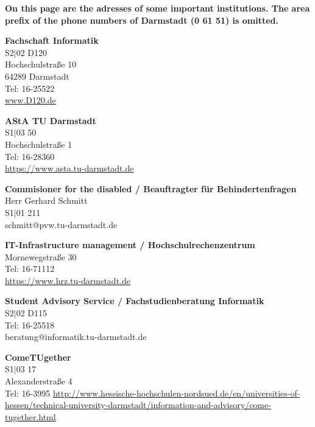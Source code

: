 \newpage


\textbf{On this page are the adresses of some important institutions. The area prefix of the phone numbers of Darmstadt (0 61 51) is omitted.}

\begin{multicols}{2}

\textbf{Fachschaft Informatik}\\
S2$|$02 D120\\
Hochschulstraße 10\\
64289 Darmstadt\\
Tel: 16-25522\\
\url{www.D120.de}

\vspace{3mm}
\textbf{AStA TU Darmstadt}\\
S1$|$03 50\\
Hochschulstraße 1\\
Tel: 16-28360\\
\url{https://www.asta.tu-darmstadt.de}

\vspace{3mm}
\textbf{Commisioner for the disabled / Beauftragter für Behindertenfragen}\\
Herr Gerhard Schmitt\\
S1$|$01 211\\
schmitt@pvw.tu-darmstadt.de

\vspace{3mm}
\textbf{IT-Infrastructure management / Hochschulrechenzentrum}\\
Mornewegstraße 30 \\
Tel: 16-71112\\
\url{https://www.hrz.tu-darmstadt.de}

\vspace{3mm}
\textbf{Student Advisory Service / Fachstudienberatung Informatik}\\
S2$|$02 D115\\
Tel: 16-25518 \\
beratung@informatik.tu-darmstadt.de

\vspace{3mm}
\textbf{ComeTUgether}\\
S1$|$03 17\\
Alexanderstraße 4\\
Tel: 16-3995
\url{http://www.hessische-hochschulen-nordsued.de/en/universities-of-hessen/technical-university-darmstadt/information-and-advisory/come-tugether.html}


\end{multicols}
